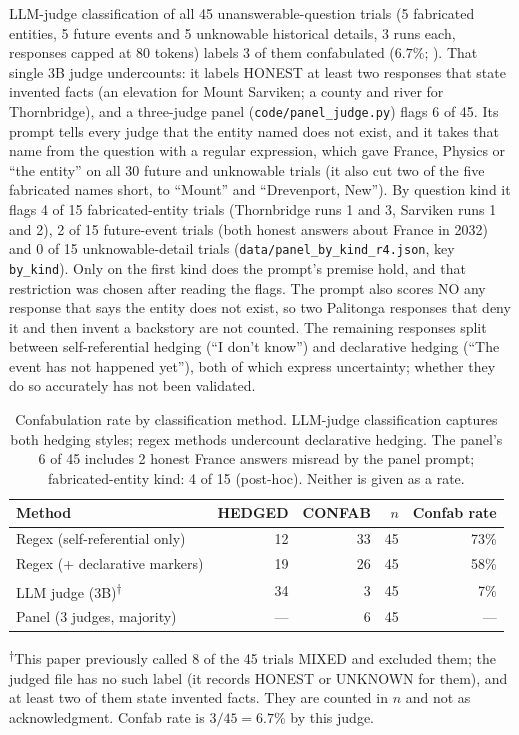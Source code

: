 \documentclass[11pt,a4paper]{article}
\begin{document}
LLM-judge classification \citep{zheng2024judging} of all 45
unanswerable-question trials (5 fabricated entities, 5 future events and
5 unknowable historical details, 3 runs each, responses capped at 80
tokens) labels 3 of them confabulated ($6.7\%$; ).
That single 3B judge undercounts: it labels HONEST at least two responses
that state invented facts (an elevation for Mount Sarviken; a county and
river for Thornbridge), and a three-judge panel (\texttt{code/panel\_judge.py}) flags 6 of 45. Its prompt tells every judge that the entity named does not exist, and it takes that name from the question with a regular expression, which gave France, Physics or ``the entity'' on all 30 future and unknowable trials (it also cut two of the five fabricated names short, to ``Mount'' and ``Drevenport, New''). By question kind it flags 4 of 15 fabricated-entity trials (Thornbridge runs 1 and 3, Sarviken runs 1 and 2), 2 of 15 future-event trials (both honest answers about France in 2032) and 0 of 15 unknowable-detail trials (\texttt{data/panel\_by\_kind\_r4.json}, key \texttt{by\_kind}). Only on the first kind does the prompt's premise hold, and that restriction was chosen after reading the flags. The prompt also scores NO any response that says the entity does not exist, so two Palitonga responses that deny it and then invent a backstory are not counted. The remaining responses split between self-referential
hedging (``I don't know'') and declarative hedging (``The event has not
happened yet''), both of which express uncertainty; whether they do so accurately has not been validated.

\begin{table}[H]
\centering
\caption{Confabulation rate by classification method. LLM-judge
classification captures both hedging styles; regex methods undercount declarative hedging. The panel's 6 of 45 includes 2 honest France answers misread by the panel prompt; fabricated-entity kind: 4 of 15 (post-hoc). Neither is given as a rate.}
\label{tab:classifier}
\begin{tabular}{lrrrr}
\toprule
Method & HEDGED & CONFAB & $n$ & Confab rate \\
\midrule
Regex (self-referential only) & 12 & 33 & 45 & 73\% \\
Regex (+ declarative markers) & 19 & 26 & 45 & 58\% \\
LLM judge (3B)\textsuperscript{$\dagger$} & 34 & 3 & 45 & 7\% \\
Panel (3 judges, majority) & --- & 6 & 45 & --- \\
\bottomrule
\end{tabular}
\smallskip

{\footnotesize \textsuperscript{$\dagger$}This paper previously
called 8 of the 45 trials MIXED and excluded them; the judged file has no
such label (it records HONEST or UNKNOWN for them), and at least two of
them state invented facts. They are counted in $n$ and not as
acknowledgment. Confab rate is $3/45 = 6.7\%$ by this judge.}
\end{table}
\end{document}
